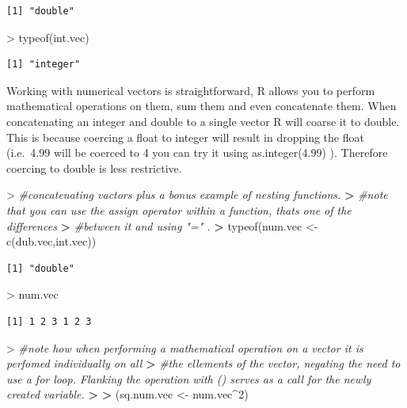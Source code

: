 \documentclass[
]{book}
\newenvironment{Shaded}{\begin{snugshade}}{\end{snugshade}}
\newcommand{\CommentTok}[1]{\textcolor[rgb]{0.56,0.35,0.01}{\textit{#1}}}
\newcommand{\DecValTok}[1]{\textcolor[rgb]{0.00,0.00,0.81}{#1}}
\newcommand{\ErrorTok}[1]{\textcolor[rgb]{0.64,0.00,0.00}{\textbf{#1}}}
\newcommand{\FunctionTok}[1]{\textcolor[rgb]{0.00,0.00,0.00}{#1}}
\newcommand{\NormalTok}[1]{#1}
\newcommand{\OtherTok}[1]{\textcolor[rgb]{0.56,0.35,0.01}{#1}}
\newcommand{\SpecialCharTok}[1]{\textcolor[rgb]{0.00,0.00,0.00}{#1}}
\theoremstyle{definition}
\theoremstyle{definition}
\theoremstyle{definition}
\theoremstyle{definition}
\theoremstyle{remark}
\begin{document}
\begin{verbatim}
[1] "double"
\end{verbatim}

\begin{Shaded}
\begin{Highlighting}[]
\SpecialCharTok{\textgreater{}} \FunctionTok{typeof}\NormalTok{(int.vec)}
\end{Highlighting}
\end{Shaded}

\begin{verbatim}
[1] "integer"
\end{verbatim}

Working with numerical vectors is straightforward, R allows you to perform mathematical operations on them,
sum them and even concatenate them. When concatenating an integer and double to a single vector R will coarse it to
double. This is because coercing a float to integer will result in dropping the float (i.e.~4.99 will be coerced to 4
you can try it using as.integer(4.99) ). Therefore coercing to double is less restrictive.

\begin{Shaded}
\begin{Highlighting}[]
\SpecialCharTok{\textgreater{}} \CommentTok{\#concatenating vactors plus a bonus example of nesting functions. }
\ErrorTok{\textgreater{}} \CommentTok{\#note that you can use the assign operator within a function, that\textquotesingle{}s one of the differences }
\ErrorTok{\textgreater{}} \CommentTok{\#between it and using "=" .}
\ErrorTok{\textgreater{}} \FunctionTok{typeof}\NormalTok{(num.vec }\OtherTok{\textless{}{-}} \FunctionTok{c}\NormalTok{(dub.vec,int.vec))}
\end{Highlighting}
\end{Shaded}

\begin{verbatim}
[1] "double"
\end{verbatim}

\begin{Shaded}
\begin{Highlighting}[]
\SpecialCharTok{\textgreater{}}\NormalTok{ num.vec}
\end{Highlighting}
\end{Shaded}

\begin{verbatim}
[1] 1 2 3 1 2 3
\end{verbatim}

\begin{Shaded}
\begin{Highlighting}[]
\SpecialCharTok{\textgreater{}} \CommentTok{\#note how when performing a mathematical operation on a vector it is perfomed individually on all}
\ErrorTok{\textgreater{}} \CommentTok{\#the ellements of the vector, negating the need to use a for loop. Flanking the operation with () serves as a call for the newly created variable.}
\ErrorTok{\textgreater{}} 
\ErrorTok{\textgreater{}}\NormalTok{ (sq.num.vec }\OtherTok{\textless{}{-}}\NormalTok{ num.vec}\SpecialCharTok{\^{}}\DecValTok{2}\NormalTok{)}
\end{Highlighting}
\end{Shaded}
\end{document}
